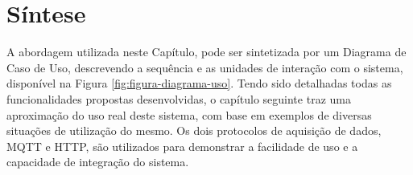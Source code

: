         \begin{figure}[!h]
    	\end{figure}
    	
\section{Síntese}
\label{sec:sintese-rscada}

A abordagem utilizada neste Capítulo, pode ser sintetizada por um Diagrama de Caso de Uso, descrevendo a sequência e as unidades de interação com o sistema, disponível na Figura \ref{fig:figura-diagrama-uso}. Tendo sido detalhadas todas as funcionalidades propostas desenvolvidas, o capítulo seguinte traz uma aproximação do uso real deste sistema, com base em exemplos de diversas situações de utilização do mesmo. Os dois protocolos de aquisição de dados, \gls{MQTT} e \gls{HTTP}, são utilizados para demonstrar a facilidade de uso e a capacidade de integração do sistema.

        \begin{figure}[!h]
    	\end{figure}
    	